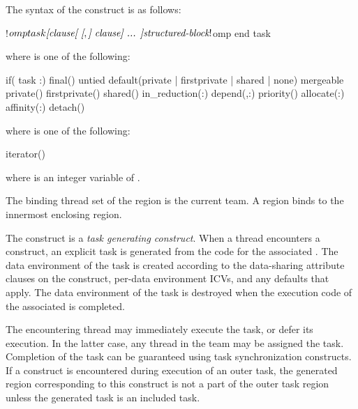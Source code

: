 \begin{fortranspecific}
The syntax of the  construct is as follows:

\begin{ompfPragma}
!$omp task \plc{[clause[ [},\plc{] clause] ... ]}
    \plc{structured-block}
!$omp end task
\end{ompfPragma}

where  is one of the following{}:

\begin{indentedcodelist}
if(\plc{[} task :\plc{] scalar-logical-expression})
final()
untied
default(private \textnormal{|} firstprivate \textnormal{|} shared \textnormal{|} none)
mergeable
private()
firstprivate()
shared()
in_reduction(:)
depend(\plc{[depend-modifier},\plc{] dependence-type }:)
priority()
allocate(\plc{[allocator }:\plc{] list})
affinity(\plc{[aff-modifier }:\plc{] locator-list})
detach()
\end{indentedcodelist}

where  is one of the following{}:
\begin{indentedcodelist}
iterator() 
\end{indentedcodelist}

where  is an integer variable of  .
\end{fortranspecific}

\binding
The binding thread set of the  region is the current team. A 
 region binds to the innermost enclosing  region.

\descr

The  construct is a \emph{task generating construct}. When a thread
encounters a  construct, an explicit task is generated from the code
for the associated . The data environment of the task is
created according to the data-sharing attribute clauses on the 
construct, per-data environment ICVs, and any defaults that apply. The data 
environment of the task is destroyed when the execution code of the associated 
 is completed.

The encountering thread may immediately execute the task, or defer its execution. 
In the latter case, any thread in the team may be assigned the task. Completion 
of the task can be guaranteed using task synchronization constructs.
If a  construct is encountered during execution of an outer
task, the generated  region corresponding to this construct is not a
part of the outer task region unless the generated task is
an included task.

